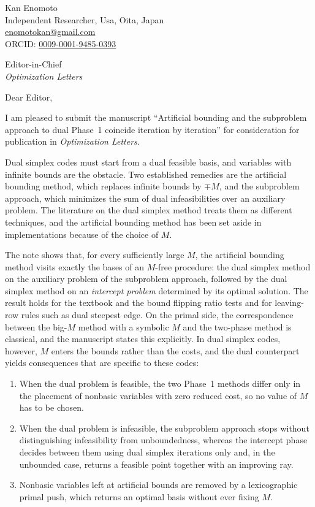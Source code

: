 \documentclass[11pt,a4paper]{article}
\begin{document}
\begin{flushright}
Kan Enomoto\\
Independent Researcher, Usa, Oita, Japan\\
\href{mailto:enomotokan@gmail.com}{enomotokan@gmail.com}\\
ORCID: \href{https://orcid.org/0009-0001-9485-0393}{0009-0001-9485-0393}
\end{flushright}

Editor-in-Chief\\
\textit{Optimization Letters}

Dear Editor,

I am pleased to submit the manuscript ``Artificial bounding and the subproblem approach to dual Phase~1 coincide iteration by iteration'' for consideration for publication in \textit{Optimization Letters}.

Dual simplex codes must start from a dual feasible basis, and variables with infinite bounds are the obstacle. Two established remedies are the artificial bounding method, which replaces infinite bounds by $\mp M$, and the subproblem approach, which minimizes the sum of dual infeasibilities over an auxiliary problem. The literature on the dual simplex method treats them as different techniques, and the artificial bounding method has been set aside in implementations because of the choice of $M$.

The note shows that, for every sufficiently large $M$, the artificial bounding method visits exactly the bases of an $M$-free procedure: the dual simplex method on the auxiliary problem of the subproblem approach, followed by the dual simplex method on an \emph{intercept problem} determined by its optimal solution. The result holds for the textbook and the bound flipping ratio tests and for leaving-row rules such as dual steepest edge. On the primal side, the correspondence between the big-$M$ method with a symbolic $M$ and the two-phase method is classical, and the manuscript states this explicitly. In dual simplex codes, however, $M$ enters the bounds rather than the costs, and the dual counterpart yields consequences that are specific to these codes:
\begin{enumerate}[leftmargin=*,topsep=0pt]
\item When the dual problem is feasible, the two Phase~1 methods differ only in the placement of nonbasic variables with zero reduced cost, so no value of $M$ has to be chosen.
\item When the dual problem is infeasible, the subproblem approach stops without distinguishing infeasibility from unboundedness, whereas the intercept phase decides between them using dual simplex iterations only and, in the unbounded case, returns a feasible point together with an improving ray.
\item Nonbasic variables left at artificial bounds are removed by a lexicographic primal push, which returns an optimal basis without ever fixing $M$.
\end{enumerate}
\end{document}
